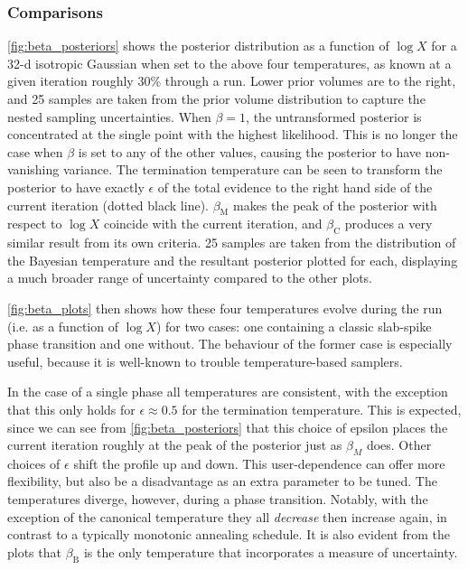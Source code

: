 \documentclass[usenatbib]{mnras}
\begin{document}
\subsubsection*{Comparisons}
\cref{fig:beta_posteriors} shows the posterior distribution as a function of $\log X$ for a 32-d isotropic Gaussian when set to the above four temperatures, as known at a given iteration roughly 30\% through a run. Lower prior volumes are to the right, and 25 samples are taken from the prior volume distribution to capture the nested sampling uncertainties. When $\beta = 1$, the untransformed posterior is concentrated at the single point with the highest likelihood. This is no longer the case when $\beta$ is set to any of the other values, causing the posterior to have non-vanishing variance. The termination temperature can be seen to transform the posterior to have exactly $\epsilon$ of the total evidence to the right hand side of the current iteration (dotted black line). $\beta_\mathrm{M}$ makes the peak of the posterior with respect to $\log X$ coincide with the current iteration, and $\beta_\mathrm{C}$ produces a very similar result from its own criteria. 25 samples are taken from the distribution of the Bayesian temperature and the resultant posterior plotted for each, displaying a much broader range of uncertainty compared to the other plots.
\par
\cref{fig:beta_plots} then shows how these four temperatures evolve during the run (i.e. as a function of $\log X$) for two cases: one containing a classic slab-spike phase transition and one without. The behaviour of the former case is especially useful, because it is well-known to trouble temperature-based samplers. 
\par
In the case of a single phase all temperatures are consistent, with the exception that this only holds for $\epsilon \approx 0.5$ for the termination temperature. This is expected, since we can see from \cref{fig:beta_posteriors} that this choice of epsilon places the current iteration roughly at the peak of the posterior just as $\beta_M$ does. Other choices of $\epsilon$ shift the profile up and down. This user-dependence can offer more flexibility, but also be a disadvantage as an extra parameter to be tuned. The temperatures diverge, however, during a phase transition. Notably, with the exception of the canonical temperature they all \textit{decrease} then increase again, in contrast to a typically monotonic annealing schedule. It is also evident from the plots that $\beta_\mathrm{B}$ is the only temperature that incorporates a measure of uncertainty.
\end{document}
